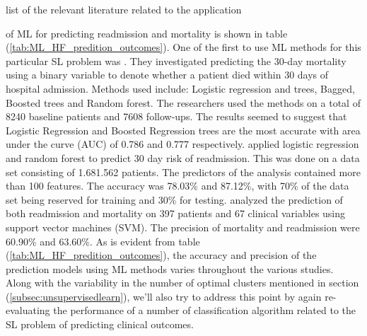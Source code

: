 \documentclass[../thesis.tex]{subfiles}
\begin{document}
list of the relevant literature related to the application



\noindent of ML for predicting readmission and mortality is shown in table (\ref{tab:ML_HF_predition_outcomes}). One of the first to use ML methods for this particular SL problem was \cite{austin2012regression}. They investigated predicting the 30-day mortality using a binary variable to denote whether a patient died within 30 days of hospital admission. Methods used include: Logistic regression and trees, Bagged, Boosted trees and Random forest. The researchers used the methods on a total of 8240 baseline patients and 7608 follow-ups. The results seemed to suggest that Logistic Regression and Boosted Regression trees are the most accurate with area under the curve (AUC) of 0.786 and 0.777 respectively. \cite{zolfaghar2013big} applied logistic regression and random forest to predict 30 day risk of readmission. This was done on a data set consisting of 1.681.562 patients. The predictors of the analysis contained more than 100 features. The accuracy was 78.03\% and 87.12\%, with 70\% of the data set being reserved for training and 30\% for testing. \cite{shah2014phenomapping} analyzed the prediction of both readmission and mortality on 397 patients and 67 clinical variables using support vector machines (SVM). The precision of mortality and readmission were 60.90\% and 63.60\%. As is evident from table (\ref{tab:ML_HF_predition_outcomes}), the accuracy and precision of the prediction models using ML methods varies throughout the various studies. Along with the variability in the number of optimal clusters mentioned in section (\ref{subsec:unsupervisedlearn}), we'll also try to address this point by again re-evaluating the performance of a number of classification algorithm related to the SL problem of predicting clinical outcomes. 
\end{document}
